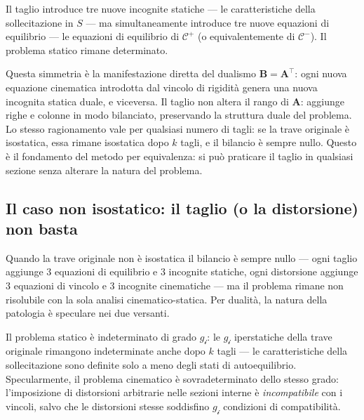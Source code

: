 Il taglio introduce tre nuove incognite statiche
--- le caratteristiche della sollecitazione in $S$ ---
ma simultaneamente introduce tre nuove equazioni di
equilibrio --- le equazioni di equilibrio di
$\mathcal{C}^+$ (o equivalentemente di $\mathcal{C}^-$).
Il problema statico rimane determinato.

\begin{oss}
	Questa simmetria è la manifestazione diretta del
	dualismo $\bm{B} = \bm{A}^{\top}$: ogni nuova equazione
	cinematica introdotta dal vincolo di rigidità genera
	una nuova incognita statica duale, e viceversa. Il
	taglio non altera il rango di $\bm{A}$: aggiunge
	righe e colonne in modo bilanciato, preservando la
	struttura duale del problema. Lo stesso ragionamento
	vale per qualsiasi numero di tagli: se la trave
	originale è isostatica, essa rimane isostatica dopo
	$k$ tagli, e il bilancio è sempre nullo. Questo è
	il fondamento del metodo per equivalenza: si può
	praticare il taglio in qualsiasi sezione senza
	alterare la natura del problema.
\end{oss}

\subsection{Il caso non isostatico: il taglio (o la	distorsione) non basta}
\label{sec:taglio_iperstatica}

Quando la trave originale non è isostatica il bilancio
è sempre nullo --- ogni taglio aggiunge $3$ equazioni
di equilibrio e $3$ incognite statiche, ogni distorsione
aggiunge $3$ equazioni di vincolo e $3$ incognite
cinematiche --- ma il problema rimane non risolubile
con la sola analisi cinematico-statica. Per dualità, la
natura della patologia è speculare nei due versanti.

Il problema statico è indeterminato di grado
$g_{\mathscr{i}}$: le $g_{\mathscr{i}}$ iperstatiche
della trave originale rimangono indeterminate anche
dopo $k$ tagli --- le caratteristiche della
sollecitazione sono definite solo a meno degli stati
di autoequilibrio. Specularmente, il problema cinematico
è sovradeterminato dello stesso grado: l'imposizione di
distorsioni arbitrarie nelle sezioni interne è
\emph{incompatibile} con i vincoli, salvo che le
distorsioni stesse soddisfino $g_{\mathscr{i}}$
condizioni di compatibilità.

